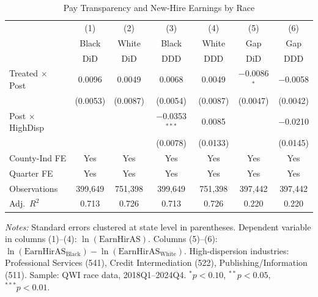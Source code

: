 \begin{table}[t]
\centering
\caption{Pay Transparency and New-Hire Earnings by Race}
\label{tab:main}
\small
\begin{tabular}{lcccccc}
\toprule
 & (1) & (2) & (3) & (4) & (5) & (6) \\
 & Black & White & Black & White & Gap & Gap \\
 & DiD & DiD & DDD & DDD & DiD & DDD \\
\midrule
Treated $\times$ Post & 0.0096 & 0.0049 & 0.0068 & 0.0049 & $-$0.0086$^{*}$ & $-$0.0058 \\
 & (0.0053) & (0.0087) & (0.0054) & (0.0087) & (0.0047) & (0.0042) \\
\addlinespace
Post $\times$ HighDisp & & & $-$0.0353$^{***}$ & 0.0085 & & $-$0.0210 \\
 & & & (0.0078) & (0.0133) & & (0.0145) \\
\midrule
County-Ind FE & Yes & Yes & Yes & Yes & Yes & Yes \\
Quarter FE & Yes & Yes & Yes & Yes & Yes & Yes \\
Observations & 399,649 & 751,398 & 399,649 & 751,398 & 397,442 & 397,442 \\
Adj.\ $R^2$ & 0.713 & 0.726 & 0.713 & 0.726 & 0.220 & 0.220 \\
\bottomrule
\end{tabular}
\begin{tablenotes}
\item \textit{Notes:} Standard errors clustered at state level in parentheses. Dependent variable in columns (1)--(4): $\ln(\text{EarnHirAS})$. Columns (5)--(6): $\ln(\text{EarnHirAS}_{\text{Black}}) - \ln(\text{EarnHirAS}_{\text{White}})$. High-dispersion industries: Professional Services (541), Credit Intermediation (522), Publishing/Information (511). Sample: QWI race data, 2018Q1--2024Q4. $^{*}p<0.10$, $^{**}p<0.05$, $^{***}p<0.01$.
\end{tablenotes}
\end{table}
